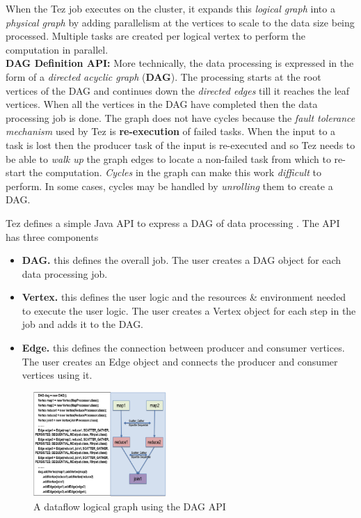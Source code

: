 \documentclass[twocolumn]{article}
\begin{document}
When the Tez
job executes on the cluster, it expands this \emph{logical graph} into a
\emph{physical graph} by adding parallelism at the vertices to scale to
the data size being processed. Multiple tasks are created per logical
vertex to perform the computation in parallel.
\\
\textbf{DAG Definition API:} More technically, the data processing is expressed in the form of a
\emph{directed acyclic graph} (\textbf{DAG}). The processing starts at
the root vertices of the DAG and continues down the \emph{directed
edges} till it reaches the leaf vertices. When all the vertices in the
DAG have completed then the data processing job is done. The graph does
not have cycles because the \emph{fault tolerance mechanism} used by Tez
is \textbf{re-execution} of failed tasks. When the input to a task is
lost then the producer task of the input is re-executed and so Tez needs
to be able to \emph{walk up} the graph edges to locate a non-failed task
from which to re-start the computation. \emph{Cycles} in the graph can
make this work \emph{difficult} to perform. In some cases, cycles may be
handled by \emph{unrolling} them to create a DAG.

Tez defines a simple Java API to express a DAG of data processing \cite{Saha:2013-02}. 
The API has three components

\begin{itemize}
\item
  \textbf{DAG.} this defines the overall job. The user creates a DAG
  object for each data processing job.
\item
  \textbf{Vertex.} this defines the user logic and the resources \&
  environment needed to execute the user logic. The user creates a
  Vertex object for each step in the job and adds it to the DAG.
\item
  \textbf{Edge.} this defines the connection between producer and
  consumer vertices. The user creates an Edge object and connects the
  producer and consumer vertices using it.
\end{itemize}

\begin{figure}[htb]
        \centering
        \includegraphics[width=0.45\textwidth]{tez11}
        \caption{A dataflow logical graph using the DAG API}
        \label{fig07}
\end{figure}
\end{document}
